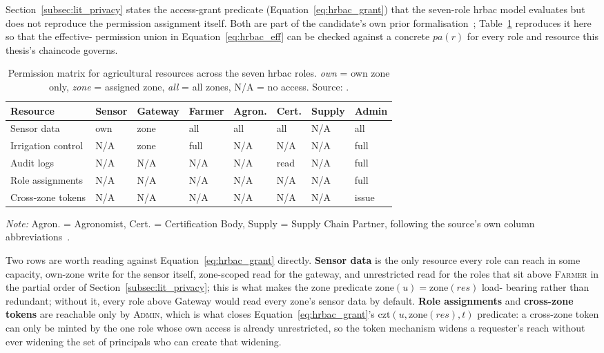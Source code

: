 \documentclass[12pt,a4paper,oneside]{book}
\begin{document}
Section~\ref{subsec:lit_privacy} states the access-grant predicate
(Equation~\ref{eq:hrbac_grant}) that the seven-role \gls{hrbac} model
evaluates but does not reproduce the permission assignment itself. Both are
part of the candidate's own prior formalisation~\cite{beloasone2025hrbac};
Table~\ref{tab:app-hrbac-matrix} reproduces it here so that the effective-
permission union in Equation~\ref{eq:hrbac_eff} can be checked against a
concrete $pa(r)$ for every role and resource this thesis's chaincode
governs.

\begin{table}[htbp]
\centering
\caption{Permission matrix for agricultural resources across the seven
         \gls{hrbac} roles. \emph{own} = own zone only, \emph{zone} =
         assigned zone, \emph{all} = all zones, N/A = no access.
         Source: \cite{beloasone2025hrbac}.}
\label{tab:app-hrbac-matrix}
\footnotesize
\begin{tabularx}{\textwidth}{@{}p{}X X X X X X X@{}}
\toprule
\textbf{Resource} & \textbf{Sensor} & \textbf{Gateway} & \textbf{Farmer} &
  \textbf{Agron.} & \textbf{Cert.} & \textbf{Supply} & \textbf{Admin} \\
\midrule
Sensor data        & own & zone & all  & all & all  & N/A   & all \\
Irrigation control  & N/A & zone & full & N/A & N/A  & N/A   & full \\
Audit logs          & N/A & N/A  & N/A  & N/A & read & N/A   & full \\
Role assignments    & N/A & N/A  & N/A  & N/A & N/A  & N/A   & full \\
Cross-zone tokens   & N/A & N/A  & N/A  & N/A & N/A  & N/A   & issue \\
\bottomrule
\end{tabularx}
{\footnotesize \textit{Note:} Agron. = Agronomist, Cert. = Certification
 Body, Supply = Supply Chain Partner, following the source's own column
 abbreviations~\cite{beloasone2025hrbac}.}
\end{table}

Two rows are worth reading against Equation~\ref{eq:hrbac_grant} directly.
\textbf{Sensor data} is the only resource every role can reach in some
capacity, own-zone write for the sensor itself, zone-scoped read for the
gateway, and unrestricted read for the roles that sit above \textsc{Farmer}
in the partial order of Section~\ref{subsec:lit_privacy}; this is what
makes the zone predicate $\mathrm{zone}(u) = \mathrm{zone}(res)$ load-
bearing rather than redundant; without it, every role above Gateway would
read every zone's sensor data by default. \textbf{Role assignments} and
\textbf{cross-zone tokens} are reachable only by \textsc{Admin}, which is
what closes Equation~\ref{eq:hrbac_grant}'s $\mathrm{czt}(u,\mathrm{zone}
(res),t)$ predicate: a cross-zone token can only be minted by the one role
whose own access is already unrestricted, so the token mechanism widens a
requester's reach without ever widening the set of principals who can
create that widening.
\clearpage{}
\end{document}
